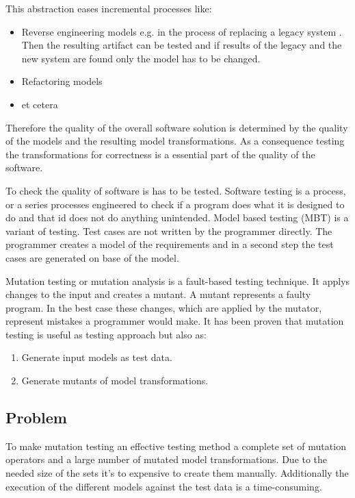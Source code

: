 \documentclass{llncs}
\begin{document}
This abstraction eases incremental processes like:\cite{Sendall:2003}
\begin{itemize}
	\item Reverse engineering models e.g. in the process of replacing a legacy system . Then the resulting artifact can be tested and if results of the legacy and the new system are found only the model has to be changed.
	\item Refactoring models
	\item et cetera
\end{itemize}

Therefore the quality of the overall software solution is determined by the quality of the models and the resulting model transformations.\cite{Hutchinson:2011} As a consequence testing the transformations for correctness is a essential part of the quality of the software.\cite{troya:2015}

To check the quality of software is has to be tested. Software testing is a process, or a series processes engineered to check if a program does what it is designed to do and that id does not do anything unintended.\cite{Myers:2004} Model based testing (MBT) is a variant of testing. Test cases are not written by the programmer directly. The programmer creates a model of the requirements and in a second step the test cases are generated on base of the model.\cite{Utting:2012}

Mutation testing or mutation analysis is a fault-based testing technique. It applys changes to the input and creates a mutant. A mutant represents a faulty program. In the best case these changes, which are applied by the mutator, represent mistakes a programmer would make. It has been proven that mutation testing is useful as testing approach but also as:\cite{mutationssurvey:yue}

\begin{enumerate}
	\item Generate input models as test data.
	\item Generate mutants of model transformations.
\end{enumerate}

\subsection{Problem}

To make mutation testing an effective testing method a complete set of mutation operators and a large number of mutated model transformations. Due to the needed size of the sets it's to expensive to create them manually. Additionally the execution of the different models against the test data is a time-consuming.
\end{document}
